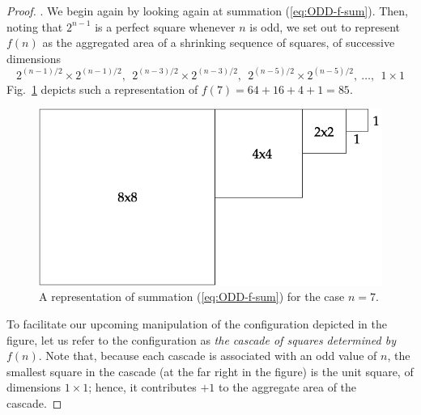 \begin{proof}
.
We begin again by looking again at summation (\ref{eq:ODD-f-sum}).
Then, noting that $2^{n-1}$ is a perfect square whenever $n$ is odd,
we set out to represent $f(n)$ as the aggregated area of a shrinking
sequence of squares, of successive dimensions
\[ 2^{(n-1)/2} \times 2^{(n-1)/2}, \ \ 2^{(n-3)/2} \times 2^{(n-3)/2},
\ \ 2^{(n-5)/2} \times 2^{(n-5)/2}, \
\ldots, \ \  1 \times 1
\]
Fig.~\ref{fig:alternatePowers2odd} depicts such a representation of
$f(7) = 64+16+4+1 = 85$.
\begin{figure} [htb]
\begin{center}
        \includegraphics[scale=0.35]{FiguresMaths/alternatePowers2initOdd.png}
\caption{A representation of summation (\ref{eq:ODD-f-sum}) for the case $n=7$.}
        \label{fig:alternatePowers2odd}
\end{center}
\end{figure}
To facilitate our upcoming manipulation of the configuration depicted
in the figure, let us refer to the configuration as {\it the cascade
  of squares determined by $f(n)$}.  Note that, because each cascade
is associated with an odd value of $n$, the smallest square in the
cascade (at the far right in the figure) is the unit square, of
dimensions $1 \times 1$; hence, it contributes $+1$ to the aggregate
area of the cascade.


\end{proof}
